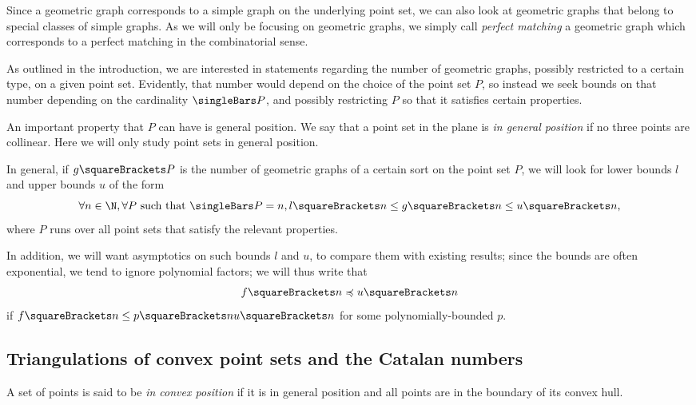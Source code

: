 \documentclass[10pt, a4paper, twoside]{basestyle}
\begin{document}
Since a geometric graph corresponds to a simple graph on the underlying point set,
we can also look at geometric graphs that belong to special classes of simple graphs.
As we will only be focusing on geometric graphs, we simply call
\emph{perfect matching}
a geometric graph which corresponds to a perfect matching in the combinatorial sense.

As outlined in the introduction, we are interested in statements regarding the number
of geometric graphs, possibly restricted to a certain type, on a given point set.
Evidently, that number would depend on the choice of the point set $P$, so instead we seek
bounds on that number depending on the cardinality $\Cardinality P$, and possibly
restricting $P$ so that it satisfies certain properties.

An important property that $P$ can have is general position. We say that 
a point set in the plane is \emph{in general position} if no three points are collinear.
Here we will only study point sets in general position.

In general, if $g\of P$ is the number of geometric graphs of a certain sort on the point
set $P$, we will look for lower bounds $l$ and upper bounds $u$ of the form\[
\forall n\in \N, \forall P \text{ such that } \Cardinality P = n,
l \of n \leq g \of n \leq u \of n \text,\]
where $P$ runs over all point sets that satisfy the relevant properties.

In addition, we will want asymptotics on such bounds $l$ and $u$, to compare them with
existing results; since the bounds are often exponential, we tend to ignore polynomial
factors; we will thus write that\[
f \of n \preccurlyeq u \of n
\]
if $f\of n \leq p\of n u \of n$ for some polynomially-bounded $p$.
\subsection{Triangulations of convex point sets and the Catalan numbers}
A set of points is said to be \emph{in convex position} if it is in general position and
all points are in the boundary of its convex hull.
\end{document}
